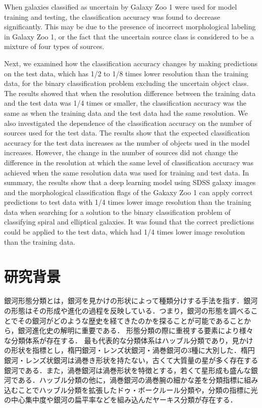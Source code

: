 \documentclass[a4j, 11pt]{jreport}
\begin{document}
When galaxies classified as uncertain by Galaxy Zoo 1 were used for model training and testing, the classification accuracy was found to decrease significantly. This may be due to the presence of incorrect morphological labeling in Galaxy Zoo 1, or the fact that the uncertain source class is considered to be a mixture of four types of sources.

Next, we examined how the classification accuracy changes by making predictions on the test data, which has 1/2 to 1/8 times lower resolution than the training data, for the binary classification problem excluding the uncertain object class. The results showed that when the resolution difference between the training data and the test data was 1/4 times or smaller, the classification accuracy was the same as when the training data and the test data had the same resolution.
We also investigated the dependence of the classification accuracy on the number of sources used for the test data. The results show that the expected classification accuracy for the test data increases as the number of objects used in the model increases. However, the change in the number of sources did not change the difference in the resolution at which the same level of classification accuracy was achieved when the same resolution data was used for training and test data. In summary, the results show that a deep learning model using SDSS galaxy images and the morphological classification flags of the Gakaxy Zoo 1 can apply correct predictions to test data with 1/4 times lower image resolution than the training data when searching for a solution to the binary classification problem of classifying spiral and elliptical galaxies. It was found that the correct predictions could be applied to the test data, which had 1/4 times lower image resolution than the training data.


\newpage
\tableofcontents       %
\thispagestyle{empty}  %
\pagebreak
{} %


\chapter{研究背景}
銀河形態分類とは，銀河を見かけの形状によって種類分けする手法を指す．銀河の形態はその形成や進化の過程を反映している．つまり，銀河の形態を調べることでその銀河がどのような歴史を経てきたのかを探ることが可能であることから，銀河進化史の解明に重要である．
形態分類の際に重視する要素により様々な分類体系が存在する．
最も代表的な分類体系はハッブル分類\cite{hubble1936}であり，見かけの形状を指標とし，楕円銀河・レンズ状銀河・渦巻銀河の3種に大別した．楕円銀河・レンズ状銀河は渦巻き形状を持たない，古くて大質量の星が多く存在する銀河である．また，渦巻銀河は渦巻形状を特徴とする，若くて星形成も盛んな銀河である．ハッブル分類の他に，渦巻銀河の渦巻腕の細かな差を分類指標に組み込むことでハッブル分類を拡張したドゥ・ボークルール分類や，分類の指標に光の中心集中度や銀河の扁平率などを組み込んだヤーキス分類が存在する．
\end{document}
